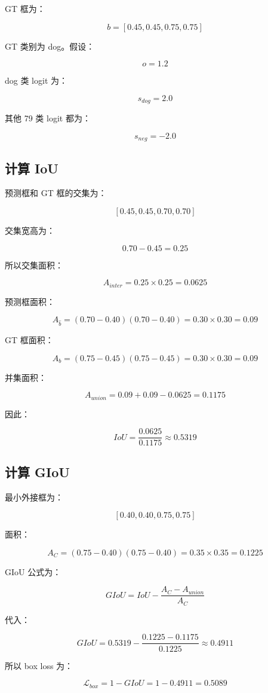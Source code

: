 \documentclass[UTF8,12pt]{ctexart}
\begin{document}
GT 框为：

\[
b=[0.45,0.45,0.75,0.75]
\]

GT 类别为 dog。假设：

\[
o=1.2
\]

dog 类 logit 为：

\[
s_{dog}=2.0
\]

其他 79 类 logit 都为：

\[
s_{neg}=-2.0
\]

\subsection{计算 IoU}

预测框和 GT 框的交集为：

\[
[0.45,0.45,0.70,0.70]
\]

交集宽高为：

\[
0.70-0.45=0.25
\]

所以交集面积：

\[
A_{inter}=0.25 \times 0.25=0.0625
\]

预测框面积：

\[
A_{\hat{b}}=(0.70-0.40)(0.70-0.40)=0.30 \times 0.30=0.09
\]

GT 框面积：

\[
A_b=(0.75-0.45)(0.75-0.45)=0.30 \times 0.30=0.09
\]

并集面积：

\[
A_{union}=0.09+0.09-0.0625=0.1175
\]

因此：

\[
IoU=\frac{0.0625}{0.1175}\approx 0.5319
\]

\subsection{计算 GIoU}

最小外接框为：

\[
[0.40,0.40,0.75,0.75]
\]

面积：

\[
A_C=(0.75-0.40)(0.75-0.40)
=0.35 \times 0.35
=0.1225
\]

GIoU 公式为：

\[
GIoU
= IoU - \frac{A_C-A_{union}}{A_C}
\]

代入：

\[
GIoU
=0.5319-\frac{0.1225-0.1175}{0.1225}
\approx 0.4911
\]

所以 box loss 为：

\[
\mathcal{L}_{box}
=1-GIoU
=1-0.4911
=0.5089
\]
\end{document}
